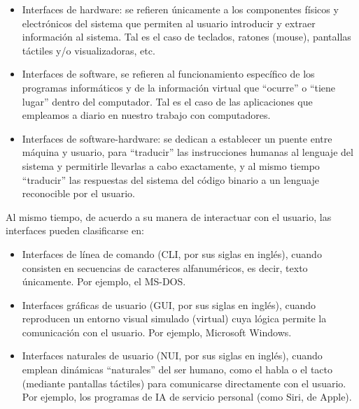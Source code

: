 \begin{itemize}
\item Interfaces de hardware: se refieren únicamente a los componentes físicos y electrónicos del sistema que permiten al usuario introducir y extraer información al sistema. Tal es el caso de teclados, ratones (mouse), pantallas táctiles y/o visualizadoras, etc.
\item Interfaces de software, se refieren al funcionamiento específico de los programas informáticos y de la información virtual que ``ocurre'' o ``tiene lugar'' dentro del computador. Tal es el caso de las aplicaciones que empleamos a diario en nuestro trabajo con computadores.
\item Interfaces de software-hardware: se dedican a establecer un puente entre máquina y usuario, para ``traducir'' las instrucciones humanas al lenguaje del sistema y permitirle llevarlas a cabo exactamente, y al mismo tiempo ``traducir'' las respuestas del sistema del código binario a un lenguaje reconocible por el usuario.
\end{itemize}

Al mismo tiempo, de acuerdo a su manera de interactuar con el usuario, las interfaces pueden clasificarse en:

\begin{itemize}
\item Interfaces de línea de comando (CLI, por sus siglas en inglés), cuando consisten en secuencias de caracteres alfanuméricos, es decir, texto únicamente. Por ejemplo, el MS-DOS.
\item Interfaces gráficas de usuario (GUI, por sus siglas en inglés), cuando reproducen un entorno visual simulado (virtual) cuya lógica permite la comunicación con el usuario. Por ejemplo, Microsoft Windows.
\item Interfaces naturales de usuario (NUI, por sus siglas en inglés), cuando emplean dinámicas “naturales” del ser humano, como el habla o el tacto (mediante pantallas táctiles) para comunicarse directamente con el usuario. Por ejemplo, los programas de IA de servicio personal (como Siri, de Apple).
\end{itemize}


